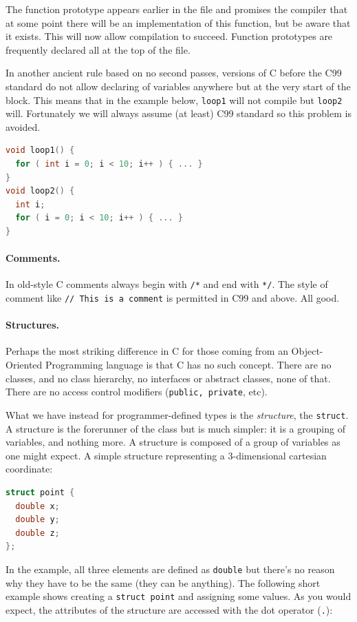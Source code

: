 The function prototype appears earlier in the file and promises the compiler that at some point there will be an implementation of this function, but be aware that it exists. This will now allow compilation to succeed. Function prototypes are frequently declared all at the top of the file.

In another ancient rule based on no second passes, versions of C before the C99 standard do not allow declaring of variables anywhere but at the very start of the block. This means that in the example below, \texttt{loop1} will not compile but \texttt{loop2} will.  Fortunately we will always assume (at least) C99 standard so this problem is avoided.

\begin{lstlisting}[language=C]
void loop1() {
  for ( int i = 0; i < 10; i++ ) { ... }
}
void loop2() {
  int i;
  for ( i = 0; i < 10; i++ ) { ... }
}
\end{lstlisting}

\paragraph{Comments.} In old-style C comments always begin with \texttt{/*} and end with \texttt{*/}. The style of comment like \texttt{// This is a comment} is permitted in C99 and above. All good.

\paragraph{Structures.} Perhaps the most striking difference in C for those coming from an Object-Oriented Programming language is that C has no such concept. There are no classes, and no class hierarchy, no interfaces or abstract classes, none of that. There are no access control modifiers (\texttt{public, private}, etc).

What we have instead for programmer-defined types is the \textit{structure}, the \texttt{struct}. A structure is the forerunner of the class but is much simpler: it is a grouping of variables, and nothing more. A structure is composed of a group of variables as one might expect. A simple structure representing a 3-dimensional cartesian coordinate:

\begin{lstlisting}[language=C]
struct point {
  double x;
  double y;
  double z;
};
\end{lstlisting}

In the example, all three elements are defined as \texttt{double} but there's no reason why they have to be the same (they can be anything). The following short example shows creating a \texttt{struct point} and assigning some values. As you would expect, the attributes of the structure are accessed with the dot operator (\texttt{.}):

